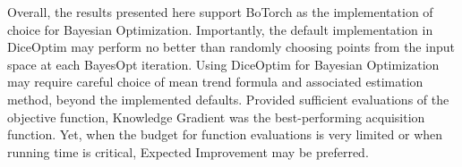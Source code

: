 Overall, the results presented here support BoTorch as the implementation of choice for Bayesian Optimization. Importantly, the default implementation in DiceOptim may perform no better than randomly choosing points from the input space at each BayesOpt iteration. Using DiceOptim for Bayesian Optimization may require careful choice of mean trend formula and associated estimation method, beyond the implemented defaults. Provided sufficient evaluations of the objective function, Knowledge Gradient was the best-performing acquisition function. Yet, when the budget for function evaluations is very limited or when running time is critical, Expected Improvement may be preferred.